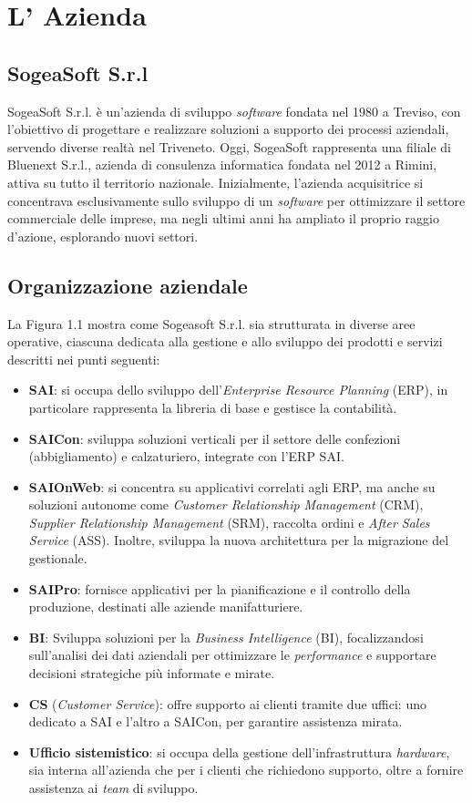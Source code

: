\chapter{L' Azienda}
    \section{SogeaSoft S.r.l}
    SogeaSoft S.r.l. è un'azienda di sviluppo \textit{software} fondata nel 1980 a Treviso, con l'obiettivo di progettare e realizzare soluzioni a supporto dei processi aziendali, servendo diverse realtà nel Triveneto.
    Oggi, SogeaSoft rappresenta una filiale di Bluenext S.r.l., azienda di consulenza informatica fondata nel 2012 a Rimini, attiva su tutto il territorio nazionale. Inizialmente, l'azienda acquisitrice si concentrava esclusivamente sullo sviluppo di un \textit{software} per ottimizzare il settore commerciale delle imprese, ma negli ultimi anni ha ampliato il proprio raggio d'azione, esplorando nuovi settori.
    
    \section{Organizzazione aziendale}
    La Figura 1.1 mostra come Sogeasoft S.r.l. sia strutturata in diverse aree operative, ciascuna dedicata alla gestione e allo sviluppo dei prodotti e servizi descritti nei punti seguenti: 
    
    \begin{itemize}
        \item \textbf{SAI}: si occupa dello sviluppo dell'\textit{Enterprise Resource Planning} (ERP), in particolare rappresenta la libreria di base e gestisce la contabilità.
        \item \textbf{SAICon}: sviluppa soluzioni verticali per il settore delle confezioni (abbigliamento) e calzaturiero, integrate con l'ERP SAI.
        \item \textbf{SAIOnWeb}: si concentra su applicativi correlati agli ERP, ma anche su soluzioni autonome come \textit{Customer Relationship Management} (CRM), \textit{Supplier Relationship Management} (SRM), raccolta ordini e \textit{After Sales Service} (ASS). Inoltre, sviluppa la nuova architettura per la migrazione del gestionale.
        \item \textbf{SAIPro}: fornisce applicativi per la pianificazione e il controllo della produzione, destinati alle aziende manifatturiere.
        \item \textbf{BI}: Sviluppa soluzioni per la \textit{Business Intelligence} (BI), focalizzandosi sull'analisi dei dati aziendali per ottimizzare le \textit{performance} e supportare decisioni strategiche più informate e mirate. 
        \item \textbf{CS} (\textit{Customer Service}): offre supporto ai clienti tramite due uffici: uno dedicato a SAI e l'altro a SAICon, per garantire assistenza mirata.
        \item \textbf{Ufficio sistemistico}: si occupa della gestione dell'infrastruttura \textit{hardware}, sia interna all'azienda che per i clienti che richiedono supporto, oltre a fornire assistenza ai \textit{team} di sviluppo.
    \end{itemize}
    
